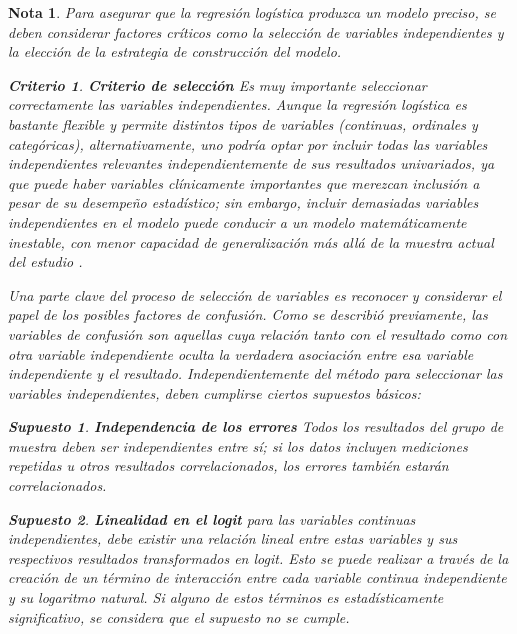 \documentclass[12pt]{article}
\newtheorem{Criterio}{Criterio}%
\newtheorem{Sup}{Supuesto}%
\newtheorem{Note}{Nota}%
\begin{document}
\begin{Note}
Para asegurar que la regresi\'on log\'istica produzca un modelo preciso, se deben considerar factores cr\'iticos como la selecci\'on de variables independientes y la elecci\'on de la estrategia de construcci\'on del modelo.

\begin{Criterio}

\textbf{Criterio de selecci\'on} Es muy importante seleccionar correctamente las variables independientes. Aunque la regresi\'on log\'istica es bastante flexible y permite distintos tipos de variables (continuas, ordinales y categ\'oricas), alternativamente, uno podr\'ia optar por incluir todas las variables independientes relevantes independientemente de sus resultados univariados, ya que puede haber variables cl\'inicamente importantes que merezcan inclusi\'on a pesar de su desempe\~no estad\'istico; sin embargo,  incluir demasiadas variables independientes en el modelo puede conducir a un modelo matem\'aticamente inestable, con menor capacidad de generalizaci\'on m\'as all\'a de la muestra actual del estudio \cite{tabachnick2007,hosmer2000}.\medskip

Una parte clave del proceso de selecci\'on de variables es reconocer y considerar el papel de los posibles factores de confusi\'on. Como se describi\'o previamente, las variables de confusi\'on son aquellas cuya relaci\'on tanto con el resultado como con otra variable independiente oculta la verdadera asociaci\'on entre esa variable independiente y el resultado. Independientemente del m\'etodo para seleccionar las variables independientes, deben cumplirse ciertos supuestos b\'asicos: 

\begin{Sup}
\textbf{Independencia de los errores} Todos los resultados del grupo de muestra deben ser independientes entre s\'i; si los datos incluyen mediciones repetidas u otros resultados correlacionados, los errores tambi\'en estar\'an correlacionados. 
\end{Sup}

\begin{Sup} \textbf{Linealidad en el logit} para las variables continuas independientes, debe existir una relaci\'on lineal entre estas variables y sus respectivos resultados transformados en logit. Esto se puede realizar a trav\'es de la creaci\'on de un t\'ermino de interacci\'on entre cada variable continua independiente y su logaritmo natural. Si alguno de estos t\'erminos es estad\'isticamente significativo, se considera que el supuesto no se cumple.
\end{Sup}


\end{Criterio}
\end{Note}
\end{document}
